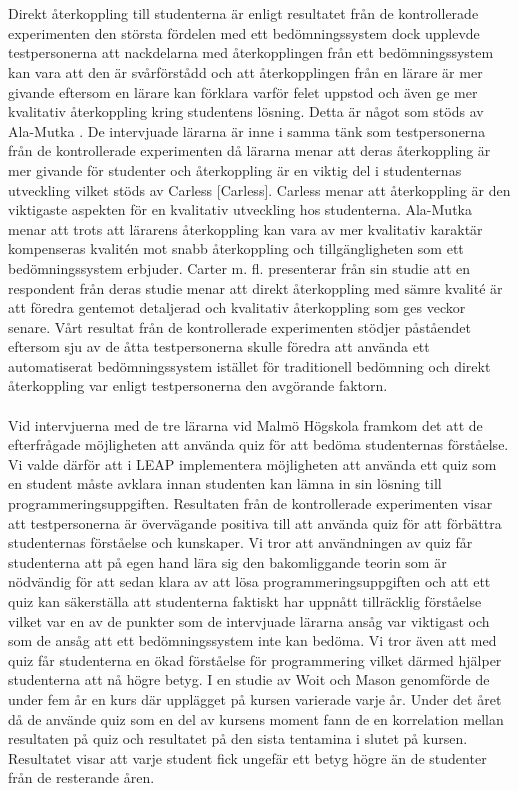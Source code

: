 \documentclass[a4paper,11pt]{article}
\begin{document}
{\\
\\
Direkt återkoppling till studenterna är enligt resultatet från de kontrollerade experimenten den största fördelen med ett bedömningssystem dock upplevde testpersonerna att nackdelarna med återkopplingen från ett bedömningssystem kan vara att den är svårförstådd och att återkopplingen från en lärare är mer givande eftersom en lärare kan förklara varför felet uppstod och även ge mer kvalitativ återkoppling kring studentens lösning. Detta är något som stöds av Ala-Mutka \cite{ala-mutka}. De intervjuade lärarna är inne i samma tänk som testpersonerna från de kontrollerade experimenten då lärarna menar att deras återkoppling är mer givande för studenter och återkoppling är en viktig del i studenternas utveckling vilket stöds av Carless [Carless]. Carless menar att återkoppling är den viktigaste aspekten för en kvalitativ utveckling hos studenterna. Ala-Mutka \cite{ala-mutka} menar att trots att lärarens återkoppling kan vara av mer kvalitativ karaktär kompenseras kvalitén mot snabb återkoppling och tillgängligheten som ett bedömningssystem erbjuder. Carter m. fl. \cite{carter} presenterar från sin studie att en respondent från deras studie menar att direkt återkoppling med sämre kvalité är att föredra gentemot detaljerad och kvalitativ återkoppling som ges veckor senare. Vårt resultat från de kontrollerade experimenten stödjer påståendet eftersom sju av de åtta testpersonerna skulle föredra att använda ett automatiserat bedömningssystem istället för traditionell bedömning och direkt återkoppling var enligt testpersonerna den avgörande faktorn. 
\\
\\
Vid intervjuerna med de tre lärarna vid Malmö Högskola framkom det att de efterfrågade möjligheten att använda quiz för att bedöma studenternas förståelse. Vi valde därför att i LEAP implementera möjligheten att använda ett quiz som en student måste avklara innan studenten kan lämna in sin lösning till programmeringsuppgiften. Resultaten från de kontrollerade experimenten visar att testpersonerna är övervägande positiva till att använda quiz för att förbättra studenternas förståelse och kunskaper. Vi tror att användningen av quiz får studenterna att på egen hand lära sig den bakomliggande teorin som är nödvändig för att sedan klara av att lösa programmeringsuppgiften och att ett quiz kan säkerställa att studenterna faktiskt har uppnått tillräcklig förståelse vilket var en av de punkter som de intervjuade lärarna ansåg var viktigast och som de ansåg att ett bedömningssystem inte kan bedöma. Vi tror även att med quiz får studenterna en ökad förståelse för programmering vilket därmed hjälper studenterna att nå högre betyg. I en studie av Woit och Mason \cite{woit_2003} genomförde de under fem år en kurs där upplägget på kursen varierade varje år. Under det året då de använde quiz som en del av kursens moment fann de en korrelation mellan resultaten på quiz och resultatet på den sista tentamina i slutet på kursen. Resultatet visar att varje student fick ungefär ett betyg högre än de studenter från de resterande åren.  
}
\end{document}
